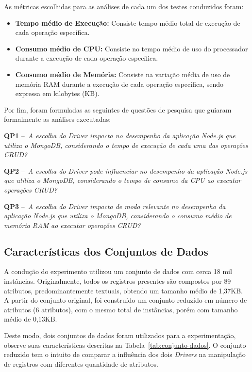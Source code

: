 \documentclass{svproc}
\begin{document}
As métricas escolhidas para as análises de cada um dos testes conduzidos foram:

\begin{itemize}
\item \textbf{Tempo médio de Execução:} Consiste tempo médio total de execução de cada operação específica.
\item \textbf{Consumo médio de CPU:} Consiste no tempo médio de uso do processador durante a execução de cada operação específica.
\item \textbf{Consumo médio de Memória:} Consiste na variação média de uso de memória RAM durante a execução de cada operação específica, sendo expressa em kilobytes (KB).
\end{itemize}

Por fim, foram formuladas as seguintes de questões de pesquisa que guiaram formalmente as análises executadas: 

\textbf{QP1} --~\emph{A escolha do Driver impacta no desempenho da aplicação Node.js que utiliza o MongoDB, considerando o tempo de execução de cada uma das operações CRUD?}

\textbf{QP2} --~\emph{A escolha do Driver pode influenciar no desempenho da aplicação Node.js que utiliza o MongoDB, considerando o tempo de consumo da CPU ao executar operações CRUD?}

\textbf{QP3} --~\emph{A escolha do Driver impacta de modo relevante no desempenho da aplicação Node.js que utiliza o MongoDB, considerando o consumo médio de memória RAM ao executar operações CRUD?}

\subsection{Características dos Conjuntos de Dados}

A condução do experimento utilizou um conjunto de dados com cerca 18 mil instâncias.%
Originalmente, todos os registros presentes são compostos por 89 atributos, predominantemente textuais, obtendo um tamanho médio de 1,37KB. 
A partir do conjunto original, foi construído um conjunto reduzido em número de atributos (6 atributos), com o mesmo total de instâncias, porém com tamanho médio de 0,13KB. 

Deste modo, dois conjuntos de dados foram utilizados para a experimentação, observe suas características descritas na Tabela~\ref{tab:conjunto-dados}. 
O conjunto reduzido tem o intuito de comparar a influência dos dois \emph{Drivers} na manipulação de registros com diferentes quantidade de atributos.
\end{document}

